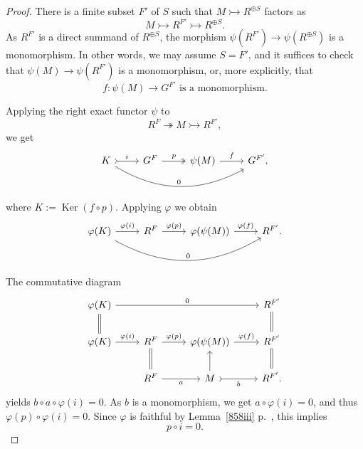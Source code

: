 \documentclass[12pt]{article}
\theoremstyle{remark}
\theoremstyle{definition}
\newcommand{\pp}{\varphi}
\newcommand{\epi}{\twoheadrightarrow}
\DeclareMathOperator{\Ker}{Ker}
\begin{document}
\begin{proof}
There is a finite subset $F'$ of $S$ such that $M\rightarrowtail R^{\oplus S}$ factors as 
$$
M\rightarrowtail R^{F'}\rightarrowtail R^{\oplus S}.
$$ 
As $R^{F'}$ is a direct summand of $R^{\oplus S}$, the morphism $\psi(R^{F'})\to\psi(R^{\oplus S})$ is a monomorphism. In other words, we may assume $S=F'$, and it suffices to check that $\psi(M)\to\psi(R^{F'})$ is a monomorphism, or, more explicitly, that 
%
\begin{equation}\label{fpsi}
f:\psi(M)\to G^{F'}\text{ is a monomorphism.}
\end{equation}

Applying the right exact functor $\psi$ to 
$$
R^F\epi M\rightarrowtail R^{F'},
$$
we get 
$$
\begin{tikzcd}
K\ar[tail]{r}{i}\ar[bend right]{rrr}{0}&G^F\ar[two heads]{r}{p}&\psi(M)\ar{r}{f}&G^{F'},
\end{tikzcd}
$$
where $K:=\Ker(f\circ p)$. Applying $\pp$ we obtain
$$
\begin{tikzcd}
\pp(K)\ar{r}{\pp(i)}\ar[bend right]{rrr}{0}&R^F\ar{r}{\pp(p)}&\pp(\psi(M))\ar{r}{\pp(f)}&R^{F'}.
\end{tikzcd}
$$
The commutative diagram
$$
\begin{tikzcd}
\pp(K)\ar[equal]{d}\ar{rrr}{0}&&&R^{F'}\ar[equal]{d}\\
\pp(K)\ar{r}{\pp(i)}&R^F\ar[equal]{d}\ar{r}{\pp(p)}&\pp(\psi(M))\ar{r}{\pp(f)}&R^{F'}\ar[equal]{d}\\
&R^F\ar{r}[swap]{a}&M\ar[tail]{r}[swap]{b}\ar{u}&R^{F'}.
\end{tikzcd}
$$ 
yields $b\circ a\circ\pp(i)=0$. As $b$ is a monomorphism, we get $a\circ\pp(i)=0$, and thus $\pp(p)\circ\pp(i)=0$. Since $\pp$ is faithful by Lemma~\ref{858iii} p.~\pageref{858iii}, this implies 
%
\begin{equation}\label{pi=0}
p\circ i=0.
\end{equation} 


\end{proof}
\end{document}
